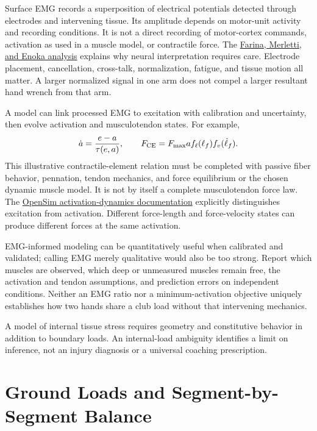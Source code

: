 Surface EMG records a superposition of electrical potentials detected through
electrodes and intervening tissue. Its amplitude depends on motor-unit activity
and recording conditions. It is not a direct recording of motor-cortex commands,
activation as used in a muscle model, or contractile force. The
\href{https://pubmed.ncbi.nlm.nih.gov/25277737/}{Farina, Merletti, and Enoka analysis}
explains why neural interpretation requires care. Electrode placement,
cancellation, cross-talk, normalization, fatigue, and tissue motion all matter.
A larger normalized signal in one arm does not compel a larger resultant hand
wrench from that arm.

A model can link processed EMG to excitation with calibration and uncertainty,
then evolve activation and musculotendon states. For example,
\begin{equation}
 \dot a=\frac{e-a}{\tau(e,a)},\qquad
 F_{\rm CE}=F_{\max}a f_\ell(\ell_f)f_v(\dot\ell_f).
 \label{eq:activation_force_chain}
\end{equation}
This illustrative contractile-element relation must be completed with passive
fiber behavior, pennation, tendon mechanics, and force equilibrium or the chosen
dynamic muscle model. It is not by itself a complete musculotendon force law.
The \href{https://opensimconfluence.atlassian.net/wiki/spaces/OpenSim/pages/53090590/First-Order+Activation+Dynamics}{OpenSim activation-dynamics documentation}
explicitly distinguishes excitation from activation. Different force-length and
force-velocity states can produce different forces at the same activation.

EMG-informed modeling can be quantitatively useful when calibrated and validated;
calling EMG merely qualitative would also be too strong. Report which muscles
are observed, which deep or unmeasured muscles remain free, the activation and
tendon assumptions, and prediction errors on independent conditions. Neither
an EMG ratio nor a minimum-activation objective uniquely establishes how two
hands share a club load without that intervening mechanics.

A model of internal tissue stress requires geometry and constitutive behavior
in addition to boundary loads. An internal-load ambiguity identifies a limit
on inference, not an injury diagnosis or a universal coaching prescription.

\section{Ground Loads and Segment-by-Segment Balance}
\label{sec:lower_body_inverse_dynamics}

